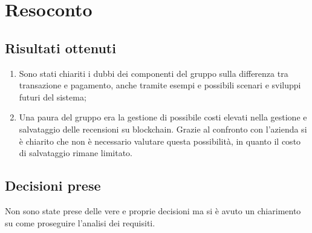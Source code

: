 \section{Resoconto}

\subsection{Risultati ottenuti}
\begin{enumerate}
    \item Sono stati chiariti i dubbi dei componenti del gruppo sulla differenza tra transazione e pagamento, anche tramite esempi e possibili scenari e sviluppi futuri del sistema;
    \item Una paura del gruppo era la gestione di possibile costi elevati nella gestione e salvataggio delle recensioni su blockchain. Grazie al confronto con l'azienda si è chiarito che non è necessario valutare questa possibilità, in quanto il costo di salvataggio rimane limitato.
\end{enumerate}

\subsection{Decisioni prese}
Non sono state prese delle vere e proprie decisioni ma si è avuto un chiarimento su come proseguire l'analisi dei requisiti.